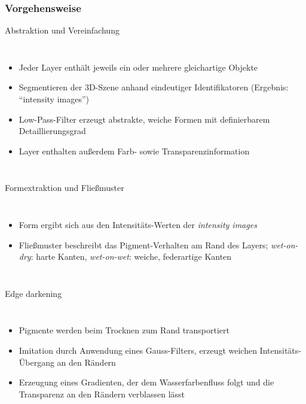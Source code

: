 \subsubsection{Vorgehensweise}
\begin{frame}{Abstraktion und Vereinfachung}
  \begin{columns}[t]
      \begin{itemize}
        \item Jeder Layer enthält jeweils ein oder mehrere gleichartige Objekte
        \item Segmentieren der 3D-Szene anhand eindeutiger Identifikatoren
        (Ergebnis: "`intensity images"')
        \item Low-Pass-Filter erzeugt abstrakte, weiche Formen mit definierbarem
        Detaillierungsgrad
        \item Layer enthalten außerdem Farb- sowie Transparenzinformation
      \end{itemize}
  \end{columns}
\end{frame}

\begin{frame}{Formextraktion und Fließmuster}
  \begin{columns}[t]
      \begin{itemize}
        \item Form ergibt sich aus den Intensitäts-Werten der \textsl{intensity
        images}
        \item Fließmuster beschreibt das Pigment-Verhalten am Rand des Layers; 
        \textsl{wet-on-dry}: harte Kanten, \textsl{wet-on-wet}: weiche, 
        federartige Kanten
      \end{itemize}
  \end{columns}
\end{frame}

\begin{frame}[label=current]{Edge darkening}
  \begin{columns}[t]
      \begin{itemize}
        \item Pigmente werden beim Trocknen zum Rand transportiert
        \item Imitation durch Anwendung eines Gauss-Filters, erzeugt weichen
        Intensitäts-Übergang an den Rändern
        \item Erzeugung eines Gradienten, der dem Wasserfarbenfluss folgt und
        die Transparenz an den Rändern verblassen lässt
      \end{itemize}
  \end{columns}
\end{frame}


